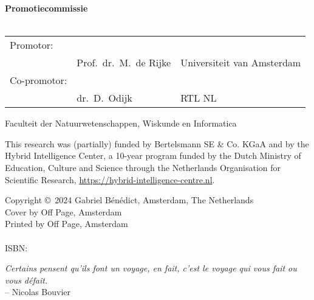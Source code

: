 {%
\clearpage
\noindent%
\textbf{Promotiecommissie} \\\\
\begin{tabular}{@{}l l l}
Promotor: \\
& Prof.\ dr.\ M.\ de Rijke & Universiteit van Amsterdam \\  %
Co-promotor: \\
& dr.\ D.\ Odijk & RTL NL \\  %

\end{tabular}

\bigskip\noindent%
Faculteit der Natuurwetenschappen, Wiskunde en Informatica\\

\vfill

\noindent
This research was (partially) funded by Bertelsmann SE \& Co. KGaA and by the Hybrid Intelligence Center, a 10-year program funded by the Dutch Ministry of Education, Culture and Science through the Netherlands Organisation for Scientific Research, \url{https://hybrid-intelligence-centre.nl}.
\bigskip

\noindent
Copyright \copyright~2024 Gabriel Bénédict, Amsterdam, The Netherlands\\		%
Cover by Off Page, Amsterdam\\
Printed by Off Page, Amsterdam\\
\\
ISBN: \todo{}\\


\clearpage






\thispagestyle{empty}
\null\vfill
\centering
\textit{Certains pensent qu'ils font un voyage, en fait, c'est le voyage qui vous fait ou vous défait.} \\ \medskip
\qquad \qquad \qquad \qquad \qquad -- {Nicolas Bouvier}
\vfill\vfill

\clearpage




}

